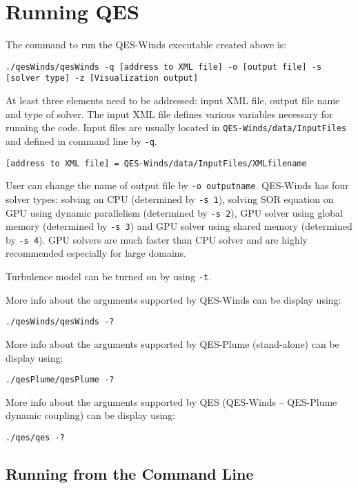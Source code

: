 \section{Running QES}

The command to run the QES-Winds executable created above is:
\begin{verbatim}
./qesWinds/qesWinds -q [address to XML file] -o [output file] -s [solver type] -z [Visualization output]
\end{verbatim}

At least three elements need to be addressed: input XML file, output file name and type of solver.
The input XML file defines various variables necessary for running the code. Input files are usually located in \verb|QES-Winds/data/InputFiles| and defined in command line by \verb|-q|.

\begin{verbatim}
[address to XML file] = QES-Winds/data/InputFiles/XMLfilename
\end{verbatim}

User can change the name of output file by  \verb|-o outputname|.
QES-Winds has four solver types: solving on CPU (determined by \verb|-s 1|), solving SOR equation on GPU using dynamic parallelism (determined by \verb|-s 2|), GPU solver using global memory (determined by \verb|-s 3|) and GPU solver using shared memory (determined by \verb|-s 4|). GPU solvers are much faster than CPU solver and are highly recommended especially for large domains.

Turbulence model can be turned on by using \verb|-t|.

More info about the arguments supported by QES-Winds can be display using:
\begin{verbatim}
./qesWinds/qesWinds -?
\end{verbatim}

More info about the arguments supported by QES-Plume (stand-alone) can be display using:
\begin{verbatim}
./qesPlume/qesPlume -?
\end{verbatim}
More info about the arguments supported by QES (QES-Winds -- QES-Plume dynamic coupling) can be display using:
\begin{verbatim}
./qes/qes -?
\end{verbatim}

\subsection{Running from the Command Line}

